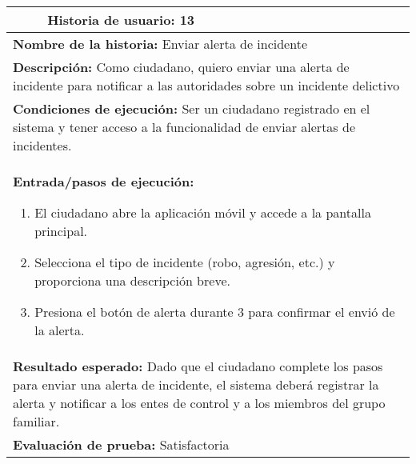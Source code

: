 \begin{longtable}{|p{6.7cm}|p{6.7cm}|}
    \hline
    \endlastfoot
    \multicolumn{1}{|p{6.7cm}|}{\textbf{Número} 13 } & \multicolumn{1}{|p{6.7cm}|}{\textbf{Historia de usuario:} 13}                                                                                                                                       \\
    \hline
    \multicolumn{2}{|p{13.4cm}|}{\textbf{Nombre de la historia:} Enviar alerta de incidente }                                                                                                                                                              \\
    \hline
    \multicolumn{2}{|p{13.4cm}|}{\textbf{Descripción:} Como ciudadano, quiero enviar una alerta de incidente para notificar a las autoridades sobre un incidente delictivo}                                                                                \\
    \hline
    \multicolumn{2}{|p{13.4cm}|}{\textbf{Condiciones de ejecución:} Ser un ciudadano registrado en el sistema y tener acceso a la funcionalidad de enviar alertas de incidentes.}                                                                          \\
    \hline
    \multicolumn{2}{|p{13.4cm}|}{\textbf{Entrada/pasos de ejecución:}
    \begin{enumerate}[label=\arabic*.]
        \item El ciudadano abre la aplicación móvil y accede a la pantalla principal.
        \item Selecciona el tipo de incidente (robo, agresión, etc.) y proporciona una descripción breve.
        \item Presiona el botón de alerta durante 3 para confirmar el envió de la alerta.
    \end{enumerate}
    }                                                                                                                                                                                                                                                      \\
    \hline
    \multicolumn{2}{|p{13.4cm}|}{\textbf{Resultado esperado:} Dado que el ciudadano complete los pasos para enviar una alerta de incidente, el sistema deberá registrar la alerta y notificar a los entes de control y a los miembros del grupo familiar.} \\
    \hline
    \multicolumn{2}{|p{13.4cm}|}{\textbf{Evaluación de prueba:} Satisfactoria}                                                                                                                                                                             \\
    \hline
\end{longtable}

